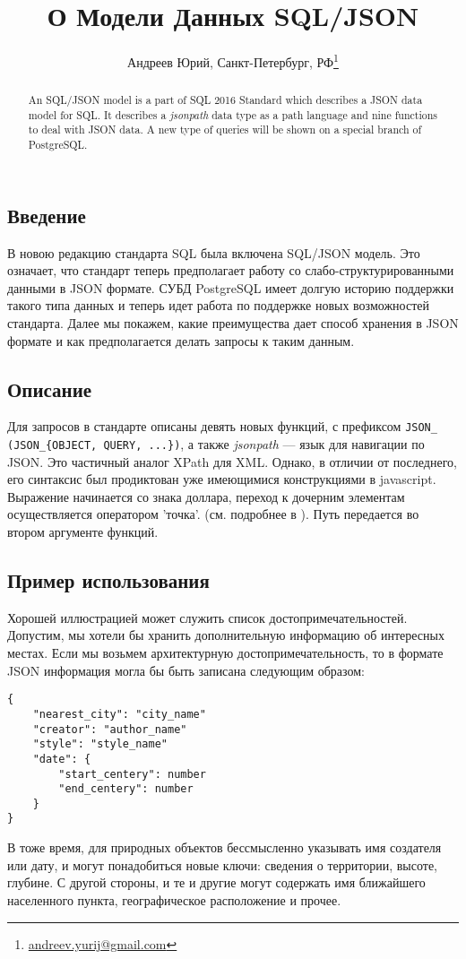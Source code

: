 \documentclass[10pt, a5paper]{article}
\begin{document}
\title{О Модели Данных SQL/JSON}
\author{Андреев Юрий, Санкт-Петербург, РФ\footnote{\url{andreev.yurij@gmail.com}}}
\maketitle
\begin{abstract}
An SQL/JSON model is a part of SQL 2016 Standard\cite{AY1} which describes a JSON data model for SQL.
It describes a \textit{jsonpath} data type as a path language and nine functions to deal with JSON data.
A new type of queries will be shown on a special branch of PostgreSQL.
\end{abstract}

\subsection*{Введение}
В новою редакцию стандарта SQL\cite{AY1} была включена SQL/JSON модель.
Это означает, что стандарт теперь предполагает работу со слабо-структурированными
данными в JSON формате\cite{AY2}. СУБД PostgreSQL имеет долгую историю поддержки такого типа данных
и теперь идет работа по поддержке новых возможностей \linebreak стандарта\cite{AY4}.
Далее мы покажем, какие преимущества дает способ хранения в JSON формате и как 
предполагается делать запросы к таким данным.

\subsection*{Описание}
Для запросов в стандарте описаны девять новых функций, с префиксом 
\texttt{JSON\_ (JSON\_\{OBJECT, QUERY, ...\})},
а также \textit{jsonpath} --- язык для навигации по JSON. Это частичный аналог XPath для XML. 
Однако, в отличии от последнего, его синтаксис был продиктован уже имеющимися конструкциями в javascript. 
Выражение начинается со знака доллара, переход к дочерним элементам осуществляется оператором 'точка'.
(см. подробнее в \cite{AY3}). Путь передается во втором аргументе функций. 

\subsection*{Пример использования}
Хорошей иллюстрацией может служить список достопримечательностей. 
Допустим, мы хотели бы хранить дополнительную информацию об интересных местах. 
Если мы возьмем архитектурную достопримечательность, 
то в формате JSON информация могла бы быть записана следующим образом:
\begin{verbatim}
{
    "nearest_city": "city_name"
    "creator": "author_name"
    "style": "style_name"
    "date": {
        "start_centery": number
        "end_centery": number
    }
}
\end{verbatim}
В тоже время, для природных объектов бессмысленно указывать имя создателя или дату,
и могут понадобиться новые ключи: сведения о территории, высоте, глубине. 
С другой стороны, и те и другие могут содержать имя ближайшего населенного пункта, 
географическое расположение и прочее. 
\end{document}

